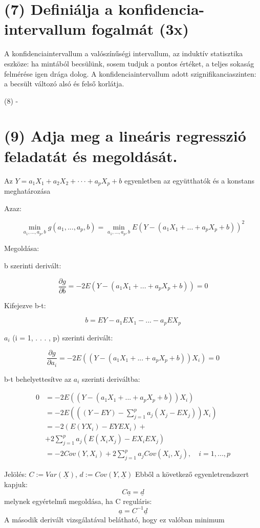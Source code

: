 \documentclass[12p]{article}
\begin{document}
\section{(7) Definiálja a konfidencia-intervallum fogalmát (3x)}

A konfidenciaintervallum a valószínűségi intervallum, az induktív statisztika eszköze: ha mintából becsülünk, sosem tudjuk a pontos értéket, a teljes sokaság felmérése igen drága dolog. A konfidenciaintervallum adott szignifikanciaszinten: a becsült változó alsó és felső korlátja.

(8) -

\section{(9) Adja meg a lineáris regresszió feladatát és megoldását.}

Az $Y = a_1X_1 + a_2X_2 + · · · + a_pX_p + b$ egyenletben az
együtthatók és a konstans meghatározása

Azaz:

$$\min_{a_1, ..., a_p,b} g(a_1,...,a_p,b) = \min_{a_1,...,a_p,b} E(Y - (a_1X_1 + ... + a_pX_p+b))^2$$

Megoldása:

b szerinti derivált:

$$\frac{\partial g}{\partial b} = -2E(Y - (a_1X_1 + ... + a_pX_p + b)) = 0$$

Kifejezve b-t:

$$b = EY - a_1EX_1 - ... - a_pEX_p$$

$a_i$ (i = 1, . . . , p) szerinti derivált:

$$\frac{\partial g}{\partial a_i} = -2E((Y-(a_1X_1 + ... + a_pX_p + b))X_i) = 0$$

b-t behelyettesítve az $a_i$ szerinti deriváltba:

\begin{align*}
0  &= -2E((Y - (a_1X_1 + ... + a_pX_p + b))X_i)\\
 &= -2E\left(\left((Y - EY) - \sum_{j = 1}^p a_j(X_j - EX_j)\right)X_i\right)\\
 &= -2(E(YX_i) - EYEX_i) +\\
 &+ 2 \sum_{j=1}^p a_j(E(X_iX_j) - EX_iEX_j)\\
 &= -2Cov(Y,X_i) + 2\sum_{j=1}^p a_j Cov(X_i,X_j), \quad i=1,...,p
\end{align*}

Jelölés: $C := Var(\underline{X})$, $d := Cov(Y, \underline{X})$
Ebből a következő egyenletrendszert kapjuk:
$$C\underline{a} = \underline{d}$$
melynek egyértelmű megoldása, ha C reguláris:
$$\underline{a} = C^{-1}\underline{d}$$
A második derivált vizsgálatával belátható, hogy ez
valóban minimum
\end{document}
